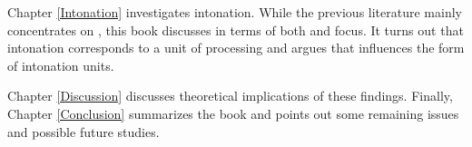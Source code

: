\begin{refsection}
\newpage 
Chapter \ref{Intonation} investigates intonation.
While the previous literature mainly concentrates on ,
this book discusses in terms of both  and focus.
It turns out that intonation corresponds to a unit of processing and
argues that  influences the form of intonation units.

Chapter \ref{Discussion} discusses theoretical implications of these findings.
Finally, Chapter \ref{Conclusion} summarizes the book
and points out some remaining issues and possible future studies.

\end{refsection}
